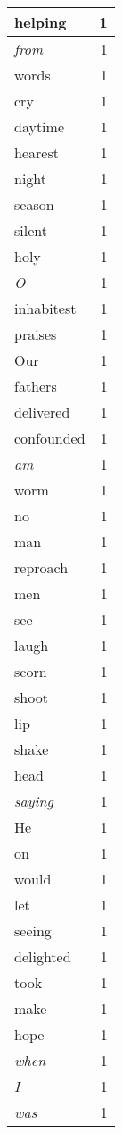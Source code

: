 \begin{center}
\begin{longtable}{l|r}
helping & 1 \\ \hline
\emph{from} & 1 \\ \hline
words & 1 \\ \hline
cry & 1 \\ \hline
daytime & 1 \\ \hline
hearest & 1 \\ \hline
night & 1 \\ \hline
season & 1 \\ \hline
silent & 1 \\ \hline
holy & 1 \\ \hline
\emph{O} & 1 \\ \hline
inhabitest & 1 \\ \hline
praises & 1 \\ \hline
Our & 1 \\ \hline
fathers & 1 \\ \hline
delivered & 1 \\ \hline
confounded & 1 \\ \hline
\emph{am} & 1 \\ \hline
worm & 1 \\ \hline
no & 1 \\ \hline
man & 1 \\ \hline
reproach & 1 \\ \hline
men & 1 \\ \hline
see & 1 \\ \hline
laugh & 1 \\ \hline
scorn & 1 \\ \hline
shoot & 1 \\ \hline
lip & 1 \\ \hline
shake & 1 \\ \hline
head & 1 \\ \hline
\emph{saying} & 1 \\ \hline
He & 1 \\ \hline
on & 1 \\ \hline
would & 1 \\ \hline
let & 1 \\ \hline
seeing & 1 \\ \hline
delighted & 1 \\ \hline
took & 1 \\ \hline
make & 1 \\ \hline
hope & 1 \\ \hline
\emph{when} & 1 \\ \hline
\emph{I} & 1 \\ \hline
\emph{was} & 1 \\ \hline

\end{longtable}
\end{center}
